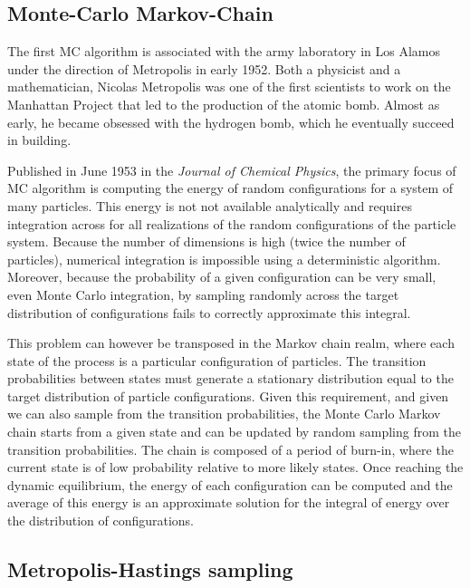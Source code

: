 \subsection{Monte-Carlo Markov-Chain}

The first \acrshort{MC} algorithm is associated with the army laboratory in Los Alamos under the direction of Metropolis in early 1952.
Both a physicist and a mathematician, Nicolas Metropolis was one of the first scientists to work on the Manhattan Project that led to the production of the atomic bomb.
Almost as early, he became obsessed with the hydrogen bomb, which he eventually succeed in building.

Published in June 1953 in the \textit{Journal of Chemical Physics}, the primary focus of \acrshort{MC} algorithm is computing the energy of random configurations for a system of many particles.
This energy is not not available analytically and requires integration across for all realizations of the random configurations of the particle system.
Because the number of dimensions is high (twice the number of particles), numerical integration is impossible using a deterministic algorithm.
Moreover, because the probability of a given configuration can be very small, even Monte Carlo integration, by sampling randomly across the target distribution of configurations fails to correctly approximate this integral.

This problem can however be transposed in the Markov chain realm, where each state of the process is a particular configuration of particles.
The transition probabilities between states must generate a stationary distribution equal to the target distribution of particle configurations.
Given this requirement, and given we can also sample from the transition probabilities, the Monte Carlo Markov chain starts from a given state and can be updated by random sampling from the transition probabilities.
The chain is composed of a period of burn-in, where the current state is of low probability relative to more likely states.
Once reaching the dynamic equilibrium, the energy of each configuration can be computed and the average of this energy is an approximate solution for the integral of energy over the distribution of configurations.


\subsection{Metropolis-Hastings sampling}

